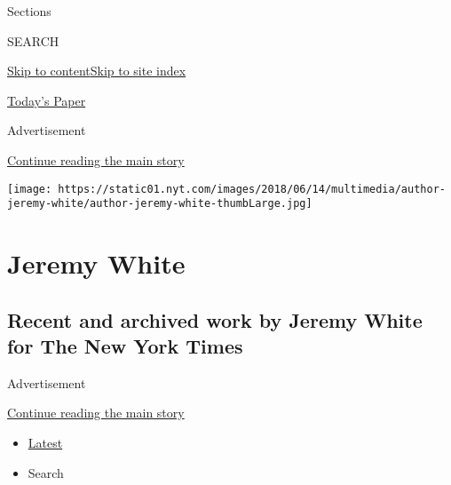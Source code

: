 Sections

SEARCH

\protect\hyperlink{site-content}{Skip to
content}\protect\hyperlink{site-index}{Skip to site index}

\href{https://myaccount.nytimes.com/auth/login?response_type=cookie\&client_id=vi}{}

\href{https://www.nytimes.com/section/todayspaper}{Today's Paper}

Advertisement

\protect\hyperlink{after-top}{Continue reading the main story}

\texttt{[image: https://static01.nyt.com/images/2018/06/14/multimedia/author-jeremy-white/author-jeremy-white-thumbLarge.jpg]}

\hypertarget{jeremy-white}{%
\section{Jeremy White}\label{jeremy-white}}

\hypertarget{recent-and-archived-work-by-jeremy-white-for-the-new-york-times}{%
\subsection{Recent and archived work by Jeremy White for The New York
Times}\label{recent-and-archived-work-by-jeremy-white-for-the-new-york-times}}

Advertisement

\protect\hyperlink{after-mid1}{Continue reading the main story}

\begin{itemize}
\tightlist
\item
  \protect\hyperlink{stream-panel}{Latest}
\item
  Search
\end{itemize}

